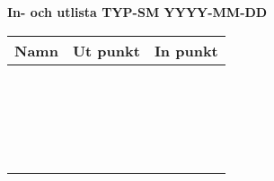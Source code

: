 \documentclass[notitlepage, oneside, 12pt]{article}
\begin{document}
\begin{center}
\noindent\huge\bf In- och utlista TYP-SM YYYY-MM-DD %
\end{center}

\addvspace{1cm}

\begin{center}
\begin{tabular}{@{}|p{}|p{}|p{}|@{}}
\hline
\Large\bf Namn & \Large\bf Ut punkt & \Large\bf In punkt \\
\hline
\rule{0pt}{1cm} & & \\
\hline
\rule{0pt}{1cm} & & \\
\hline
\rule{0pt}{1cm} & & \\
\hline
\rule{0pt}{1cm} & & \\
\hline
\rule{0pt}{1cm} & & \\
\hline
\rule{0pt}{1cm} & & \\
\hline
\rule{0pt}{1cm} & & \\
\hline
\rule{0pt}{1cm} & & \\
\hline
\rule{0pt}{1cm} & & \\
\hline
\rule{0pt}{1cm} & & \\
\hline
\rule{0pt}{1cm} & & \\
\hline
\rule{0pt}{1cm} & & \\
\hline
\rule{0pt}{1cm} & & \\
\hline
\rule{0pt}{1cm} & & \\
\hline
\rule{0pt}{1cm} & & \\
\hline
\rule{0pt}{1cm} & & \\
\hline
\rule{0pt}{1cm} & & \\
\hline
\rule{0pt}{1cm} & & \\
\hline
\rule{0pt}{1cm} & & \\
\hline
\rule{0pt}{1cm} & & \\
\hline
\end{tabular}
\end{center}
\end{document}
